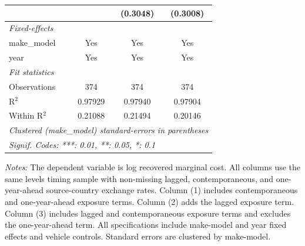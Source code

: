 \begin{table}[htbp]
\begin{tabular}{lccc}
                                               &                  & (0.3048)               & (0.3008)\\
      \midrule
      \emph{Fixed-effects}\\
      make\_model                              & Yes              & Yes                    & Yes\\
      year                                     & Yes              & Yes                    & Yes\\
      \midrule
      \emph{Fit statistics}\\
      Observations                             & 374              & 374                    & 374\\
      R$^2$                                    & 0.97929          & 0.97940                & 0.97904\\
      Within R$^2$                             & 0.21088          & 0.21494                & 0.20146\\
      \midrule \midrule
      \multicolumn{4}{l}{\emph{Clustered (make\_model) standard-errors in parentheses}}\\
      \multicolumn{4}{l}{\emph{Signif. Codes: ***: 0.01, **: 0.05, *: 0.1}}\\
   \end{tabular}
\vspace{0.25em}
\begin{minipage}{0.96\textwidth}
\footnotesize \textit{Notes:} The dependent variable is log recovered marginal cost. All columns use the same levels timing sample with non-missing lagged, contemporaneous, and one-year-ahead source-country exchange rates. Column (1) includes contemporaneous and one-year-ahead exposure terms. Column (2) adds the lagged exposure term. Column (3) includes lagged and contemporaneous exposure terms and excludes the one-year-ahead term. All specifications include make-model and year fixed effects and vehicle controls. Standard errors are clustered by make-model.
\end{minipage}
\end{table}

